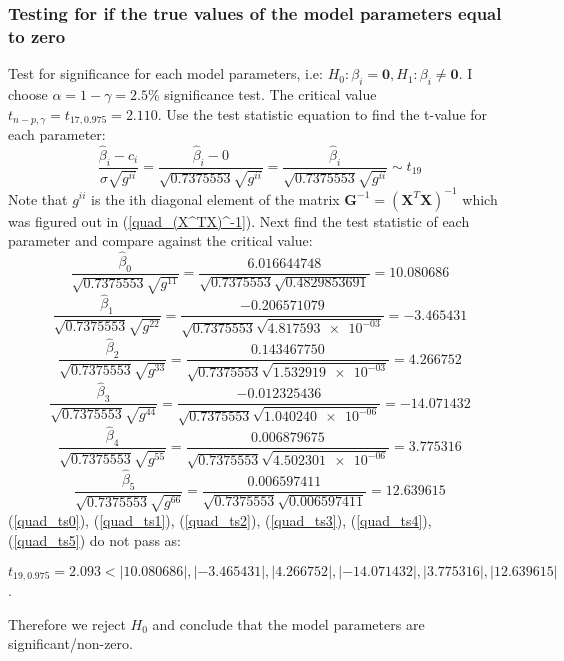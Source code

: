\documentclass[12pt]{article}
\newcommand{\vect}[1]{\boldsymbol{#1}}
\newcommand{\trans}[1]{#1^T}
\newcommand{\est}[1]{\hat{#1}}
\begin{document}
\subsubsection{Testing for if the true values of the model parameters equal to zero}
Test for significance for each model parameters, i.e: $H_0: \beta_i = \vect{0}, H_1: \beta_i \neq \vect{0}$. I choose $\alpha = 1-\gamma = 2.5\%$ significance test. The critical value $t_{n-p, \gamma}=t_{17, 0.975} = 2.110$. Use the test statistic equation to find the t-value for each parameter:
\begin{equation*}
    \frac{\est{\beta}_i - c_i} {\est{\sigma}\sqrt{g^{ii}}}
  = \frac{\est{\beta}_i - 0} {\sqrt{0.7375553}\sqrt{g^{ii}}}
  = \frac{\est{\beta}_i} {\sqrt{0.7375553}\sqrt{g^{ii}}}
  \sim t_{19}
\end{equation*}
Note that $g^{ii}$ is the ith diagonal element of the matrix $\vect{G}^{-1} = (\trans{\vect{X}}\vect{X})^{-1}$ which was figured out in (\ref{quad_(X^TX)^-1}). Next find the test statistic of each parameter and compare against the critical value:
\begin{equation} \label{quad_ts0}
    \frac{\est{\beta}_0} {\sqrt{0.7375553}\sqrt{g^{11}}}
  = \frac{6.016644748} {\sqrt{0.7375553}\sqrt{0.4829853691}}
  = 10.080686
\end{equation}
\begin{equation} \label{quad_ts1}
    \frac{\est{\beta}_1} {\sqrt{0.7375553}\sqrt{g^{22}}}
  = \frac{-0.206571079} {\sqrt{0.7375553}\sqrt{\num{4.817593e-03}}}
  = -3.465431
\end{equation}
\begin{equation} \label{quad_ts2}
    \frac{\est{\beta}_2} {\sqrt{0.7375553}\sqrt{g^{33}}}
  = \frac{0.143467750} {\sqrt{0.7375553}\sqrt{\num{1.532919e-03}}}
  = 4.266752
\end{equation}
\begin{equation} \label{quad_ts3}
    \frac{\est{\beta}_3} {\sqrt{0.7375553}\sqrt{g^{44}}}
  = \frac{-0.012325436} {\sqrt{0.7375553}\sqrt{\num{1.040240e-06}}}
  = -14.071432
\end{equation}
\begin{equation} \label{quad_ts4}
    \frac{\est{\beta}_4} {\sqrt{0.7375553}\sqrt{g^{55}}}
  = \frac{0.006879675} {\sqrt{0.7375553}\sqrt{\num{4.502301e-06}}}
  = 3.775316
\end{equation}
\begin{equation} \label{quad_ts5}
    \frac{\est{\beta}_5} {\sqrt{0.7375553}\sqrt{g^{66}}}
  = \frac{0.006597411} {\sqrt{0.7375553}\sqrt{0.006597411}}
  = 12.639615
\end{equation}
(\ref{quad_ts0}), (\ref{quad_ts1}), (\ref{quad_ts2}), (\ref{quad_ts3}), (\ref{quad_ts4}), (\ref{quad_ts5}) do not pass as: \par
$t_{19, 0.975} = 2.093 < |10.080686|, |-3.465431|, |4.266752|, |-14.071432|, |3.775316|, |12.639615|$.\par
Therefore we reject $H_0$ and conclude that the model parameters are significant/non-zero.
\end{document}
